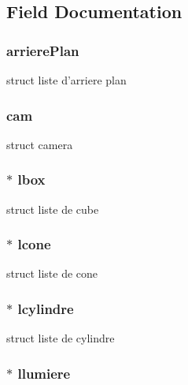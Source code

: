 \subsection{Field Documentation}
\hypertarget{structobjet_a2c4fed069a158bd329fc92ff1a608896}{
\subsubsection[{arrierePlan}]{ {\bf arrierePlan}}}
\label{structobjet_a2c4fed069a158bd329fc92ff1a608896}
struct liste d'arriere plan \hypertarget{structobjet_a16ecffc15a7a4163203346c420ba58f6}{
\subsubsection[{cam}]{ {\bf cam}}}
\label{structobjet_a16ecffc15a7a4163203346c420ba58f6}
struct camera \hypertarget{structobjet_a5b7114d3e4c7527479db2477acc69180}{
\subsubsection[{lbox}]{$\ast$ {\bf lbox}}}
\label{structobjet_a5b7114d3e4c7527479db2477acc69180}
struct liste de cube \hypertarget{structobjet_aa328f20993d25abe873904ada1aadad0}{
\subsubsection[{lcone}]{$\ast$ {\bf lcone}}}
\label{structobjet_aa328f20993d25abe873904ada1aadad0}
struct liste de cone \hypertarget{structobjet_a28b52bc13fd24dcd25e9e9d6c073ee97}{
\subsubsection[{lcylindre}]{$\ast$ {\bf lcylindre}}}
\label{structobjet_a28b52bc13fd24dcd25e9e9d6c073ee97}
struct liste de cylindre \hypertarget{structobjet_a6c4654d9a5ac31412ffe066d9113018d}{
\subsubsection[{llumiere}]{$\ast$ {\bf llumiere}}}
